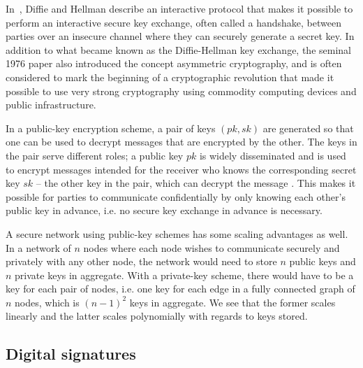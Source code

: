 In~\cite{diffie1976new}, Diffie and Hellman describe an interactive protocol that makes it possible to perform an interactive secure key exchange, often called a handshake, between parties over an insecure channel where they can securely generate a secret key. In addition to what became known as the Diffie-Hellman key exchange, the seminal 1976 paper also introduced the concept asymmetric cryptography, and is often considered to mark the beginning of a cryptographic revolution that made it possible to use very strong cryptography using commodity computing devices and public infrastructure. 

In a public-key encryption scheme, a pair of keys $(pk, sk)$ are generated so that one can be used to decrypt messages that are encrypted by the other. The keys in the pair serve different roles; a public key $pk$ is widely disseminated and is used to encrypt messages intended for the receiver who knows the corresponding secret key $sk$ – the other key in the pair, which can decrypt the message \cite[p.~370]{lindell2014introduction}. This makes it possible for parties to communicate confidentially by only knowing each other's public key in advance, i.e. no secure key exchange in advance is necessary. 

A secure network using public-key schemes has some scaling advantages as well. In a network of $n$ nodes where each node wishes to communicate securely and privately with any other node, the network would need to store $n$ public keys and $n$ private keys in aggregate. With a private-key scheme, there would have to be a key for each pair of nodes, i.e. one key for each edge in a fully connected graph of $n$ nodes, which is $(n-1)^2$ keys in aggregate. We see that the former scales linearly and the latter scales polynomially with regards to keys stored. 

\subsection{Digital signatures}

